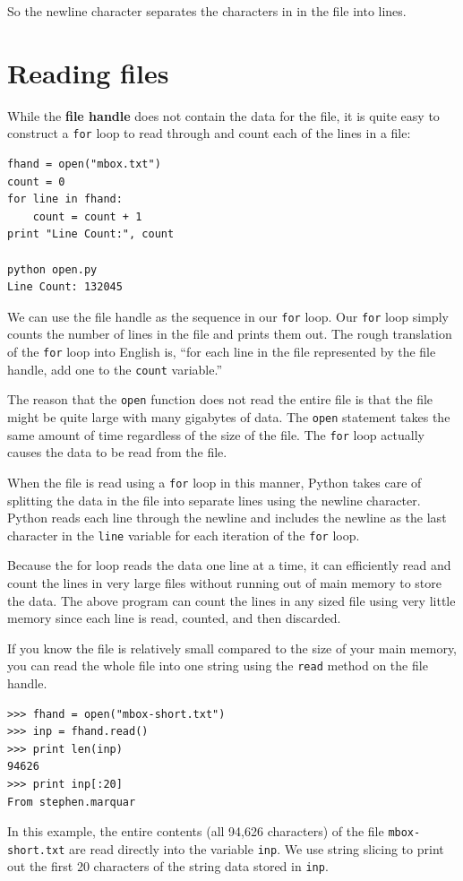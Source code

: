 \documentclass[10pt]{book}
\begin{document}
So the newline character separates the characters 
in in the file into lines.

\section{Reading files}

While the {\bf file handle} does not contain the data for the file,
it is quite easy to construct a {\tt for} loop to read through 
and count each of the lines in a file:

\beforeverb
\begin{verbatim}
fhand = open("mbox.txt")
count = 0
for line in fhand:
    count = count + 1
print "Line Count:", count

python open.py 
Line Count: 132045
\end{verbatim}
\afterverb
%
We can use the file handle as the sequence in our {\tt for} loop.  
Our {\tt for} loop simply counts the number of lines in the 
file and prints them out.  The rough translation of the {\tt for}
loop into English is, ``for each line in the file represented by the file
handle, add one to the {\tt count} variable.''

The reason that the {\tt open} function does not read the entire file
is that the file might be quite large with many gigabytes of data.
The {\tt open} statement takes the same amount of time regardless of the
size of the file.  The {\tt for} loop actually causes the data to be 
read from the file.

When the file is read using a {\tt for} loop in this manner, Python
takes care of splitting the data in the file into separate lines using
the newline character.  Python reads each line through 
the newline and includes
the newline as the last character in the {\tt line} variable for each 
iteration of the {\tt for} loop.

Because the for loop reads the data one line at a time, it can efficiently
read and count the lines in very large files without running 
out of main memory to store the data.  The above program can 
count the lines in any sized file using very little memory since 
each line is read, counted, and then discarded.

If you know the file is relatively small compared to the size of 
your main memory, you can read the whole file into one string
using the {\tt read} method on the file handle.

\beforeverb
\begin{verbatim}
>>> fhand = open("mbox-short.txt")
>>> inp = fhand.read()
>>> print len(inp)
94626
>>> print inp[:20]
From stephen.marquar
\end{verbatim}
\afterverb
%
In this example, the entire contents (all 94,626 characters) 
of the file {\tt mbox-short.txt} are read directly into the 
variable {\tt inp}.  We use string slicing to print out the first
20 characters of the string data stored in {\tt inp}.
\end{document}
